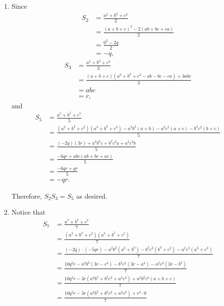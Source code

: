 \begin{enumerate}
    \item Since
          \begin{align*}
              S_2 & = \frac{a^2 + b^2 + c^2}{2}                 \\
                  & = \frac{(a + b + c)^2 - 2(ab + bc + ca)}{2} \\
                  & = \frac{0^2 - 2q}{2}                        \\
                  & = -q,
          \end{align*}
          \begin{align*}
              S_3 & = \frac{a^3 + b^3 + c^3}{3}                                    \\
                  & = \frac{(a + b + c)(a^2 + b^2 + c^2 - ab - bc - ca) + 3abc}{3} \\
                  & = abc                                                          \\
                  & = r,
          \end{align*}
          and
          \begin{align*}
              S_5 & = \frac{a^5 + b^5 + c^5}{5}                                                                        \\
                  & = \frac{(a^2 + b^2 + c^2)(a^3 + b^3 + c^3) - a^2b^2 (a + b) - a^2c^2 (a + c) - b^2 c^2 (b + c)}{5} \\
                  & = \frac{(-2q)(3r) + a^2 b^2 c + b^2 c^2 a + a^2 c^2 b}{5}                                          \\
                  & = \frac{-6qr + abc(ab + bc + ac)}{5}                                                               \\
                  & = \frac{-6qr + qr}{5}                                                                              \\
                  & = -qr.
          \end{align*}

          Therefore, \(S_2 S_3 = S_5\) as desired.

    \item Notice that
          \begin{align*}
              S_7 & = \frac{a^7 + b^7 + c^7}{7}                                                                      \\
                  & = \frac{(a^2 + b^2 + c^2)(a^5 + b^5 + c^5)}{7}                                                   \\
                  & = \frac{(-2q) \cdot (-5qr) - a^2 b^2 (a^3 + b^3) - b^2 c^2 (b^3 + c^3) - a^2 c^2 (a^3 + c^3)}{7} \\
                  & = \frac{10q^2 r - a^2 b^2 (3r - c^3) - b^2 c^2 (3r - a^3) - a^2 c^2 (3r - b^3)}{7}               \\
                  & = \frac{10q^2 r - 3r (a^2b^2 + b^2 c^2 + a^2 c^2) + a^2 b^2 c^2 (a + b + c)}{7}                  \\
                  & = \frac{10q^2 r - 3r(a^2b^2 + b^2c^2 + a^2c^2) + r^2 \cdot 0}{7}
          \end{align*}
\end{enumerate}